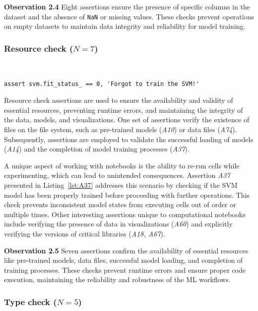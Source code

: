 \documentclass[smallextended]{svjour3}       %
\newcommand{\highlight}[1]{\begin{framed}%
  \noindent#1
\end{framed}}
\begin{document}
\highlight{\textbf{Observation 2.4} Eight assertions ensure the presence of specific columns in the dataset and the absence of \texttt{NaN} or missing values. These checks prevent operations on empty datasets to maintain data integrity and reliability for model training.}

\subsubsection{Resource check ($N = 7$)}~\label{sec:result-rq2-resource-check}

\begin{lstlisting}[caption={Assertion \emph{A37} used to ensure that an ML model has not reached an inconsistent state due to out-of-order or re-execution of code cells.}, label={lst:A37}]
assert svm.fit_status_ == 0, 'Forgot to train the SVM!'
\end{lstlisting}

Resource check assertions are used to ensure the availability and validity of essential resources, preventing runtime errors, and maintaining the integrity of the data, models, and visualizations. One set of assertions verify the existence of files on the file system, such as pre-trained models (\emph{A10}) or data files (\emph{A74}). Subsequently, assertions are employed to validate the successful loading of models (\emph{A14}) and the completion of model training processes (\emph{A37}).

A unique aspect of working with notebooks is the ability to re-run cells while experimenting, which can lead to unintended consequences. Assertion \emph{A37} presented in Listing~\ref{lst:A37} addresses this scenario by checking if the SVM model has been properly trained before proceeding with further operations. This check prevents inconsistent model states from executing cells out of order or multiple times. Other interesting assertions unique to computational notebooks include verifying the presence of data in visualizations (\emph{A60}) and explicitly verifying the versions of critical libraries (\emph{A18, A67}).

\highlight{\textbf{Observation 2.5} Seven assertions confirm the availability of essential resources like pre-trained models, data files, successful model loading, and completion of training processes. These checks prevent runtime errors and ensure proper code execution, maintaining the reliability and robustness of the ML workflows.}

\subsubsection{Type check ($N = 5$)}
\end{document}
